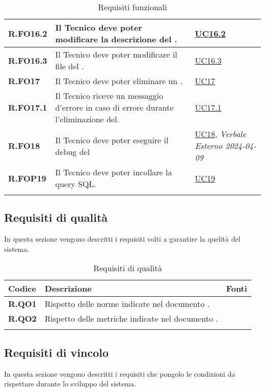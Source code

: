 \begin{longtable}{|P{3cm}|P{6,5cm}|>{\arraybackslash}P{4cm}|}
    \hline
    \textbf{R.FO16.2} & Il Tecnico deve poter modificare la descrizione del . &  \hyperref[UC16point2]{UC16.2}\\
    \hline
    \textbf{R.FO16.3} & Il Tecnico deve poter modificare il file del . &  \hyperref[UC16point3]{UC16.3}\\
    \hline
    \textbf{R.FO17} & Il Tecnico deve poter eliminare un . &  \hyperref[UC17]{UC17}\\
    \hline
    \textbf{R.FO17.1} & Il Tecnico riceve un messaggio d'errore in caso di errore durante l'eliminazione del. &  \hyperref[UC17point1]{UC17.1}\\
    \hline
    \textbf{R.FO18} & Il Tecnico deve poter eseguire il debug del  &  \hyperref[UC18]{UC18}, \emph{Verbale Esterno 2024-04-09}\\
    \hline
    \textbf{R.FOP19} & Il Tecnico deve poter incollare la query SQL. &  \hyperref[UC19]{UC19}\\
    \hline
\caption{Requisiti funzionali}
\label{requisitifunzionali}
\end{longtable}

\subsection{Requisiti di qualità}
In questa sezione vengono descritti i requisiti volti a garantire la quelità del sistema.

\begin{longtable}{|P{3cm}|P{6,5cm}|>{\arraybackslash}P{4cm}|}
  \hline
  \textbf{Codice} & \textbf{Descrizione} & \textbf{Fonti} \\
  \hline
  \textbf{R.QO1} & Rispetto delle norme indicate nel documento \NdP{}. & \NdP{} \\
  \hline
  \textbf{R.QO2} & Rispetto delle metriche indicate nel documento \PdQ{}. & \NdP{} \\
  \hline
\caption{Requisiti di qualità}
\label{requisitiqualita}
\end{longtable}

\subsection{Requisiti di vincolo}
In questa sezione vengono descritti i requisiti che pongolo le condizioni da rispettare durante lo sviluppo del sistema.

